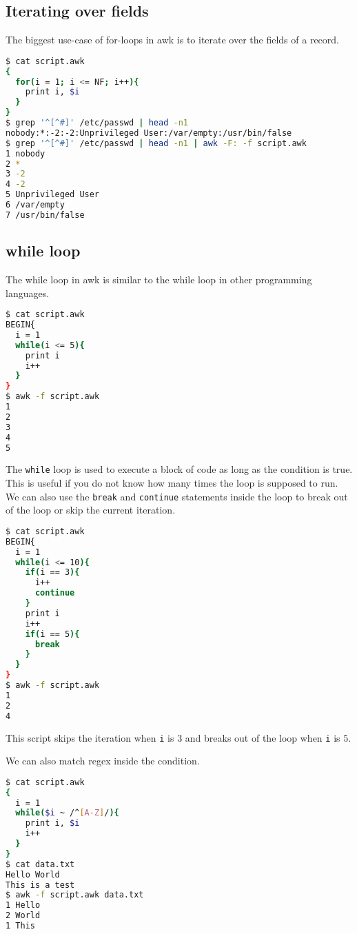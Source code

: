 \subsection{Iterating over fields}

The biggest use-case of for-loops in awk is to iterate over the fields of a record.

\begin{lstlisting}[language=bash]
$ cat script.awk
{
  for(i = 1; i <= NF; i++){
    print i, $i
  }
}
$ grep '^[^#]' /etc/passwd | head -n1 
nobody:*:-2:-2:Unprivileged User:/var/empty:/usr/bin/false
$ grep '^[^#]' /etc/passwd | head -n1 | awk -F: -f script.awk
1 nobody
2 *
3 -2
4 -2
5 Unprivileged User
6 /var/empty
7 /usr/bin/false
\end{lstlisting}

\subsection{while loop}

The while loop in awk is similar to the while loop in other programming languages.

\begin{lstlisting}[language=bash]
$ cat script.awk
BEGIN{
  i = 1
  while(i <= 5){
    print i
    i++
  }
}
$ awk -f script.awk
1
2
3
4
5
\end{lstlisting}

The \lstinline|while| loop is used to execute a block of code as long as the condition is true.
This is useful if you do not know how many times the loop is supposed to run.
We can also use the \lstinline|break| and \lstinline|continue| statements inside the loop to break out of the loop or skip the current iteration.

\begin{lstlisting}[language=bash]
$ cat script.awk
BEGIN{
  i = 1
  while(i <= 10){
    if(i == 3){
      i++
      continue
    }
    print i
    i++
    if(i == 5){
      break
    }
  }
}
$ awk -f script.awk
1
2
4
\end{lstlisting}

This script skips the iteration when \lstinline|i| is $3$ and breaks out of the loop when \lstinline|i| is $5$.

We can also match regex inside the condition.

\begin{lstlisting}[language=bash]
$ cat script.awk
{
  i = 1
  while($i ~ /^[A-Z]/){
    print i, $i
    i++
  }
}
$ cat data.txt
Hello World
This is a test
$ awk -f script.awk data.txt
1 Hello
2 World
1 This
\end{lstlisting}

